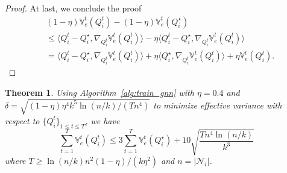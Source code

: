 \documentclass{article}
\newtheorem{theorem}{Theorem}
\begin{document}
\begin{proof}
At last, we conclude the proof
\begin{align}
	&(1-\eta)\mathbb{V}_e^t(Q_i^t)-(1-\eta)\mathbb{V}_e^t(Q_i^{\star}) \\
	&\leq \langle Q_i^{t}-Q_i^{\star}, \nabla_{Q_i^t}\mathbb{V}_e^t(Q_i^t)\rangle - \eta\langle Q_i^{t}-Q_i^{\star}, \nabla_{Q_i^t}\mathbb{V}_e^t(Q_i^t)\rangle \\
	&= \langle Q_i^{t}-Q_i^{\star}, \nabla_{Q_i^t}\mathbb{V}_e^t(Q_i^t)\rangle + \eta\langle Q_i^{\star}, \nabla_{Q_i^t}\mathbb{V}_e^t(Q_i^t)\rangle + \eta\mathbb{V}_e^t(Q_i^t).
\end{align}
\end{proof}


\begin{theorem}\label{theorem:bs}
	Using Algorithm~\ref{alg:train_gnn} with $\eta=0.4$ and $\delta=\sqrt{(1-\eta)\eta^4 k^5 \ln(n/k)/(T n^4)}$ to minimize effective variance with respect to $\{Q_i^t\}_{1\leq t\leq T}$, we have 
	\begin{equation}
		\sum_{t=1}^T\mathbb{V}_e^t(Q_i^t) \leq 3\sum_{t=1}^T\mathbb{V}_e^t(Q_i^{\star}) + 10\sqrt{\frac{Tn^4\ln(n/k)}{k^3}}
	\end{equation}
	where $T\geq \ln(n/k)n^2(1-\eta)/(k\eta^2)$ and $n=\left|\mathcal{N}_i\right|$.
\end{theorem}
\end{document}
